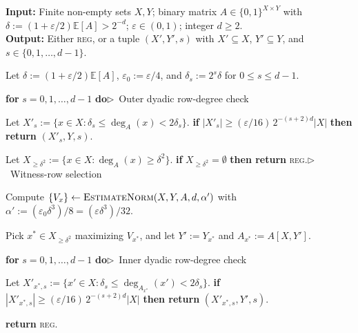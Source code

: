 \documentclass[11pt]{article}
\theoremstyle{definition}
\newcommand{\algcomment}[1]{\hfill $\triangleright$~{\small #1}}
\renewcommand{\label}[1]{}%
\newcommand{\E}{\mathbb{E}}
\newcommand{\abs}[1]{\left\lvert #1 \right\rvert}
\newcommand{\dens}[1]{\E[#1]}
\newcommand{\EstimateNorm}{\textnormal{\textsc{EstimateNorm}}}
\newcommand{\Sift}{\textnormal{\textsc{Sift}}}
\newcommand{\tagreg}{\textnormal{\textsc{reg}}}
\begin{document}
\begin{algorithm}[t]
\caption{$\Sift(X, Y, A, \varepsilon, d)$}\label{alg:sift}
\textbf{Input:} Finite non-empty sets $X, Y$; binary matrix $A \in \{0, 1\}^{X \times Y}$ with $\delta := (1 + \varepsilon/2)\dens{A} > 2^{-d}$; $\varepsilon \in (0, 1)$; integer $d \ge 2$.\\
\textbf{Output:} Either \tagreg{}, or a tuple $(X', Y', s)$ with $X' \subseteq X$, $Y' \subseteq Y$, and $s \in \{0, 1, \dots, d-1\}$.
\begin{algsteps}
    \item Let $\delta := (1 + \varepsilon/2)\dens{A}$, $\varepsilon_0 := \varepsilon/4$, and $\delta_s := 2^s\delta$ for $0 \le s \le d-1$.\label{line:sift-params}
    \item \textbf{for} $s = 0, 1, \dots, d-1$ \textbf{do}\algcomment{Outer dyadic row-degree check}\label{line:sift-outer-loop}
    \item \quad Let $X'_s := \{x \in X : \delta_s \le \deg_A(x) < 2\delta_s\}$. \textbf{if} $\abs{X'_s} \ge (\varepsilon/16)\, 2^{-(s+2)d}\abs{X}$ \textbf{then return} $(X'_s, Y, s)$.\label{line:sift-outer-ret}
    \item Let $X_{\ge \delta^2} := \{x \in X : \deg_A(x) \ge \delta^2\}$. \textbf{if} $X_{\ge \delta^2} = \emptyset$ \textbf{then return} \tagreg{}.\algcomment{Witness-row selection}\label{line:sift-xdelta2}
    \item Compute $\{V_x\} \gets \EstimateNorm(X, Y, A, d, \alpha')$ with $\alpha' := (\varepsilon_0 \delta^3)/8 = (\varepsilon \delta^3)/32$.\label{line:sift-est}
    \item Pick $x^* \in X_{\ge \delta^2}$ maximizing $V_{x^*}$, and let $Y' := Y_{x^*}$ and $A_{x^*} := A[X, Y']$.\label{line:sift-witness}
    \item \textbf{for} $s = 0, 1, \dots, d-1$ \textbf{do}\algcomment{Inner dyadic row-degree check}\label{line:sift-inner-loop}
    \item \quad Let $X'_{x^*, s} := \{x' \in X : \delta_s \le \deg_{A_{x^*}}(x') < 2\delta_s\}$. \textbf{if} $\abs{X'_{x^*, s}} \ge (\varepsilon/16)\, 2^{-(s+2)d}\abs{X}$ \textbf{then return} $(X'_{x^*, s}, Y', s)$.\label{line:sift-inner-ret}
    \item \textbf{return} \tagreg{}.\label{line:sift-reg}
\end{algsteps}
\end{algorithm}
\end{document}
